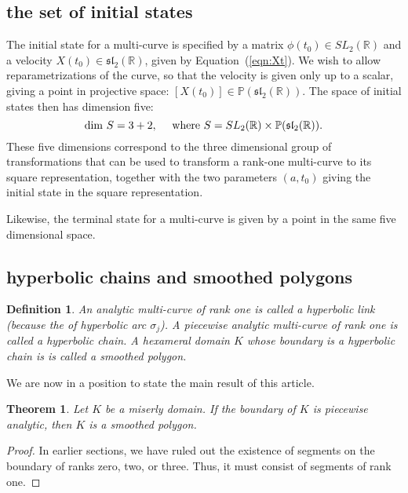 \documentclass[11pt]{amsart}
\newtheorem{definition}[equation]{Definition}
\newtheorem{thm}[equation]{Theorem}
\newcommand{\ring}[1]{\mathbb{#1}}
\begin{document}
\subsection{the set of initial states}



The initial state for a multi-curve is specified by a matrix
$\phi(t_0)\in SL_2(\ring{R})$ and a velocity
$X(t_0)\in\mathfrak{sl}_2(\ring{R})$, given by
Equation~(\ref{eqn:Xt}).  We wish to allow reparametrizations of the
curve, so that the velocity is given only up to a scalar, giving a
point in projective space:
$[X(t_0)]\in\ring{P}(\mathfrak{sl}_2(\ring{R}))$.  The space of
initial states then has dimension five:
\[
\dim\, S = 3 + 2,\quad\hbox{ where } 
S = SL_2(\ring{R}) \times\ring{P}(\mathfrak{sl}_2(\ring{R})).
\]
These five dimensions correspond to the three dimensional group of
transformations that can be used to transform a rank-one multi-curve
to its square representation, together with the two parameters $(a,t_0)$
giving the initial state in the square representation.

Likewise, the terminal state for a multi-curve is given by a point
in the same five dimensional space. 





\subsection{hyperbolic chains and smoothed polygons}

\begin{definition}
  An analytic multi-curve of rank one is called a {\it hyperbolic
    link} (because the of hyperbolic arc $\sigma_j$).  A piecewise
  analytic multi-curve of rank one is called a {\it hyperbolic chain}.
  A hexameral domain $K$ whose boundary is a hyperbolic chain is is
  called a smoothed polygon.
\end{definition}

We are now in a position to state the main result of this article.

\begin{thm}  Let $K$ be a miserly domain.  If the boundary of $K$ is piecewise analytic,
then $K$ is a smoothed polygon.
\end{thm}

\begin{proof}  
  In earlier sections, we have ruled out the existence of segments on
  the boundary of ranks zero, two, or three.  Thus, it must consist of
  segments of rank one.
\end{proof}
\end{document}

